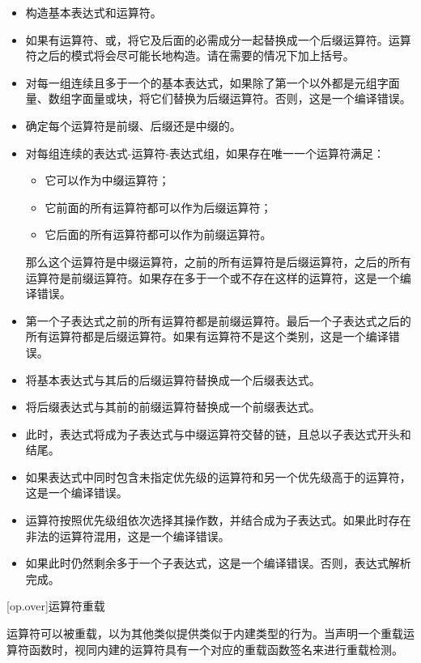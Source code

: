 \begin{itemize}
    \item 构造基本表达式和运算符。
    \item 如果有运算符、或，将它及后面的必需成分一起替换成一个后缀运算符。\enternote {}运算符之后的模式将会尽可能长地构造。请在需要的情况下加上括号。\exitnote
    \item 对每一组连续且多于一个的基本表达式，如果除了第一个以外都是元组字面量、数组字面量或块，将它们替换为后缀运算符。否则，这是一个编译错误。
    \item 确定每个运算符是前缀、后缀还是中缀的。
    \item 对每组连续的表达式-运算符-表达式组，如果存在唯一一个运算符满足：
    \begin{itemize}
        \item 它可以作为中缀运算符；
        \item 它前面的所有运算符都可以作为后缀运算符；
        \item 它后面的所有运算符都可以作为前缀运算符。
    \end{itemize}
    那么这个运算符是中缀运算符，之前的所有运算符是后缀运算符，之后的所有运算符是前缀运算符。如果存在多于一个或不存在这样的运算符，这是一个编译错误。
    \item 第一个子表达式之前的所有运算符都是前缀运算符。最后一个子表达式之后的所有运算符都是后缀运算符。如果有运算符不是这个类别，这是一个编译错误。
    \item 将基本表达式与其后的后缀运算符替换成一个后缀表达式。
    \item 将后缀表达式与其前的前缀运算符替换成一个前缀表达式。
    \item 此时，表达式将成为子表达式与中缀运算符交替的链，且总以子表达式开头和结尾。
    \item 如果表达式中同时包含未指定优先级的运算符和另一个优先级高于\tcode{==}的运算符，这是一个编译错误。
    \item 运算符按照优先级组依次选择其操作数，并结合成为子表达式。如果此时存在非法的运算符混用，这是一个编译错误。
    \item 如果此时仍然剩余多于一个子表达式，这是一个编译错误。否则，表达式解析完成。
\end{itemize}

[op.over]{运算符重载}

\pnum
运算符可以被重载，以为其他类似提供类似于内建类型的行为。当声明一个重载运算符函数时，视同内建的运算符具有一个对应的重载函数签名来进行重载检测。

